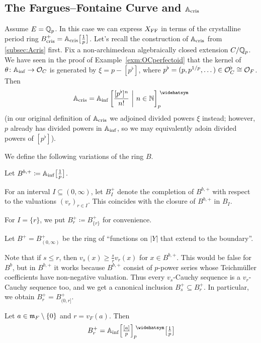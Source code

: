 \subsection{The Fargues--Fontaine Curve and \texorpdfstring{$\mathbb{A}_{\mathrm{cris}}$}{Acris}}\label{subsec:FFCandAcris}
Assume $E=\mathbb{Q}_p$. In this case we can express $X_{\mathrm{FF}}$ in terms of the crystalline period ring $B_{\mathrm{cris}}^+=\mathbb{A}_{\mathrm{cris}}\big[\textstyle\frac{1}{p}\big]$. Let's recall the construction of $\mathbb{A}_{\mathrm{cris}}$ from \cref{subsec:Acris} first. Fix a non-archimedean algebraically closed extension $C/\mathbb{Q}_p$. We have seen in the proof of Example~\cref{exm:OCperfectoid} that the kernel of $\theta\colon\IA_\inf\morphism \Oo_C$ is generated by $\xi=p-[p^\flat]$, where $p^\flat=(p,p^{1/p},\dotsc)\in \mathcal{O}_C^\flat\cong \mathcal{O}_F$. Then
\begin{equation*}
	\IA_\cris=\IA_\inf\left[\frac{[p^\flat]^n}{n!}\st n\in\IN\right]_p^\complete
\end{equation*}
(in our original definition of $\mathbb{A}_{\mathrm{cris}}$ we adjoined divided powers $\xi$ instead; however, $p$ already has divided powers in $\mathbb{A}_{\mathrm{inf}}$, so we may equivalently adoin divided powers of $[p^\flat]$).
\begin{defi}\label{def:Bb+}
	We define the following variations of the ring $B$.
	\begin{numerate}
		\item Let $B^{b,+}\coloneqq \mathbb{A}_{\mathrm{inf}}\big[\textstyle\frac{1}{p}\big]$.
		\item For an interval $I\subseteq (0,\infty)$, let $B_I^+$ denote the completion of $B^{b,+}$ with respect to the valuations $(v_r)_{r\in I}$. This coincides with the closure of $B^{b,+}$ in $B_I$.
		\item For $I=\{r\}$, we put $B_r^+\coloneqq B_{\{r\}}^+$ for convenience.
		\item Let $B^+=B_{(0,\infty)}^+$ be the ring of \enquote{functions on $|Y|$ that extend to the boundary}.
	\end{numerate}
\end{defi}
\begin{rem}\label{rem:Bs+}
	Note that if $s\leq r$, then $v_s(x)\geq \frac{s}{r}v_r(x)$ for $x\in B^{b,+}$. This would be false for $B^b$, but in $B^{b,+}$ it works because $B^{b,+}$ consist of $p$-power series whose Teichmüller coefficients have non-negative valuation. Thus every $v_s$-Cauchy sequence is a $v_r$-Cauchy sequence too, and we get a canonical inclusion $B_s^+\subseteq B_r^+$. In particular, we obtain $B_r^+=B_{(0,r]}^+$.
\end{rem}
\begin{lem}\label{lem:Br+Ainfap}
	Let $a\in\mathfrak{m}_F\setminus\{0\}$ and $r=v_F(a)$. Then
	\begin{equation*}
		B_r^+=\IA_\inf\Big[\textstyle\frac{[a]}p\Big]_p^\complete\localize{p}
	\end{equation*}
\end{lem}
